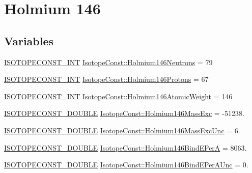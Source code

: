 \hypertarget{group___isotope_const-_holmium-_ho146}{}\section{Holmium 146}
\label{group___isotope_const-_holmium-_ho146}
\subsection*{Variables}
\begin{DoxyCompactItemize}
\item 
\mbox{\hyperlink{group___isotope_const-_macros_ga5f18360b3e99483a35c32d789e62621c}{I\+S\+O\+T\+O\+P\+E\+C\+O\+N\+S\+T\+\_\+\+I\+NT}} \mbox{\hyperlink{group___isotope_const-_holmium-_ho146_gab0503c379b7e9c462d2a320d8b111edb}{Isotope\+Const\+::\+Holmium146\+Neutrons}} = 79
\item 
\mbox{\hyperlink{group___isotope_const-_macros_ga5f18360b3e99483a35c32d789e62621c}{I\+S\+O\+T\+O\+P\+E\+C\+O\+N\+S\+T\+\_\+\+I\+NT}} \mbox{\hyperlink{group___isotope_const-_holmium-_ho146_gada0bcf8ef4f761772ecd350d5d2ee711}{Isotope\+Const\+::\+Holmium146\+Protons}} = 67
\item 
\mbox{\hyperlink{group___isotope_const-_macros_ga5f18360b3e99483a35c32d789e62621c}{I\+S\+O\+T\+O\+P\+E\+C\+O\+N\+S\+T\+\_\+\+I\+NT}} \mbox{\hyperlink{group___isotope_const-_holmium-_ho146_ga5ccb26d4039cf84c89d591a79adccbe7}{Isotope\+Const\+::\+Holmium146\+Atomic\+Weight}} = 146
\item 
\mbox{\hyperlink{group___isotope_const-_macros_ga8f45a7272ce02c0b4c65c44636ed719a}{I\+S\+O\+T\+O\+P\+E\+C\+O\+N\+S\+T\+\_\+\+D\+O\+U\+B\+LE}} \mbox{\hyperlink{group___isotope_const-_holmium-_ho146_gafd774882f48d80c4ffabf2d868752752}{Isotope\+Const\+::\+Holmium146\+Mass\+Exc}} = -\/51238.
\item 
\mbox{\hyperlink{group___isotope_const-_macros_ga8f45a7272ce02c0b4c65c44636ed719a}{I\+S\+O\+T\+O\+P\+E\+C\+O\+N\+S\+T\+\_\+\+D\+O\+U\+B\+LE}} \mbox{\hyperlink{group___isotope_const-_holmium-_ho146_ga38263e7fabf64186e74be31091d7ba33}{Isotope\+Const\+::\+Holmium146\+Mass\+Exc\+Unc}} = 6.
\item 
\mbox{\hyperlink{group___isotope_const-_macros_ga8f45a7272ce02c0b4c65c44636ed719a}{I\+S\+O\+T\+O\+P\+E\+C\+O\+N\+S\+T\+\_\+\+D\+O\+U\+B\+LE}} \mbox{\hyperlink{group___isotope_const-_holmium-_ho146_ga9cdd6d93a047d84ea56ff868c53784a9}{Isotope\+Const\+::\+Holmium146\+Bind\+E\+PerA}} = 8063.
\item 
\mbox{\hyperlink{group___isotope_const-_macros_ga8f45a7272ce02c0b4c65c44636ed719a}{I\+S\+O\+T\+O\+P\+E\+C\+O\+N\+S\+T\+\_\+\+D\+O\+U\+B\+LE}} \mbox{\hyperlink{group___isotope_const-_holmium-_ho146_ga65eb99a8474f760e8ff863f7599a2d90}{Isotope\+Const\+::\+Holmium146\+Bind\+E\+Per\+A\+Unc}} = 0.

\end{DoxyCompactItemize}
